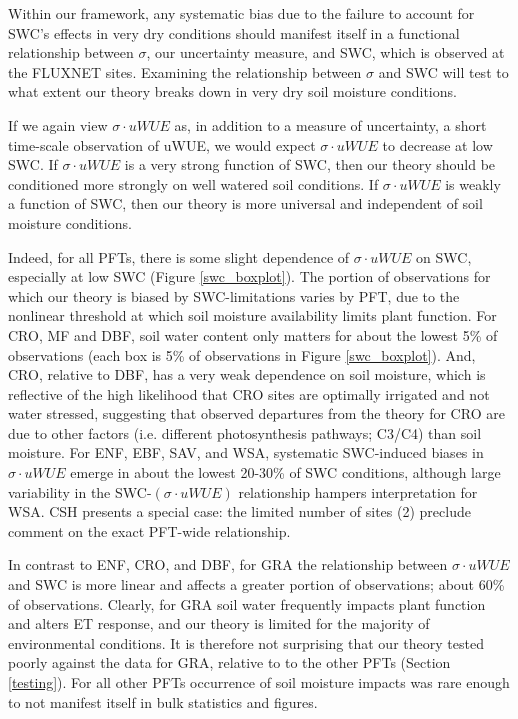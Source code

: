 Within our framework, any systematic bias due to the
failure to account for SWC's effects in very dry conditions should
manifest itself in a functional relationship between $\sigma$, our
uncertainty measure, and SWC, which is observed at the FLUXNET
sites. Examining the relationship between $\sigma$ and SWC will test
to what extent our theory breaks down in very dry soil moisture
conditions.

If we again view $\sigma \cdot uWUE$ as, in addition to a measure of
uncertainty, a short time-scale observation of uWUE, we would expect
$\sigma \cdot uWUE$ to decrease at low SWC. If $\sigma \cdot uWUE$ is
a very strong function of SWC, then our theory should be conditioned
more strongly on well watered soil conditions. If $\sigma \cdot uWUE$
is weakly a function of SWC, then our theory is more universal and
independent of soil moisture conditions.

Indeed, for all PFTs, there is some slight dependence of
$\sigma \cdot uWUE$ on SWC, especially at low SWC (Figure
\ref{swc_boxplot}). The portion of observations for which our theory
is biased by SWC-limitations varies by PFT, due to the nonlinear
threshold at which soil moisture availability limits plant
function. For CRO, MF and DBF, soil water content only matters for
about the lowest 5\% of observations (each box is 5\% of observations
in Figure \ref{swc_boxplot}). And, CRO, relative to DBF, has a very
weak dependence on soil moisture, which is reflective of the high
likelihood that CRO sites are optimally irrigated and not water
stressed, suggesting that observed departures from the theory for CRO
are due to other factors (i.e. different photosynthesis pathways; C3/C4) than soil
moisture. For ENF, EBF, SAV, and WSA, systematic SWC-induced biases in
$\sigma \cdot uWUE$ emerge in about the lowest 20-30\% of SWC
conditions, although large variability in the SWC-$(\sigma \cdot uWUE)$
relationship hampers interpretation for WSA. CSH presents a special
case: the limited number of sites (2) preclude comment on the
exact PFT-wide relationship.

In contrast to ENF, CRO, and DBF, for GRA the relationship between
$\sigma \cdot uWUE$ and SWC is more linear and affects a greater
portion of observations; about 60\% of observations. Clearly, for GRA
soil water frequently impacts plant function and alters ET response,
and our theory is limited for the majority of environmental
conditions. It is therefore not surprising that our theory tested
poorly against the data for GRA, relative to to the other PFTs
(Section \ref{testing}). For all other PFTs occurrence of soil
moisture impacts was rare enough to not manifest itself in bulk
statistics and figures.

